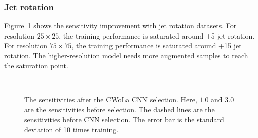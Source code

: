 \documentclass[12pt]{article}
\begin{document}
        \subsubsection{Jet rotation}%
        \label{subs:jet_rotation}
            Figure~\ref{fig:sensitivity_improvement_origin_jet_aug_SB_1_3} shows the sensitivity improvement with jet rotation datasets. For resolution $25\times 25$, the training performance is saturated around +5 jet rotation. For resolution $75\times 75$, the training performance is saturated around +15 jet rotation. The higher-resolution model needs more augmented samples to reach the saturation point.
            \begin{figure}[htpb]
                \centering
                 \\
                \caption{The sensitivities after the CWoLa CNN selection. Here, $1.0$ and $3.0$ are the sensitivities before selection. The dashed lines are the sensitivities before CNN selection. The error bar is the standard deviation of 10 times training.}
                \label{fig:sensitivity_improvement_origin_jet_aug_SB_1_3}
            \end{figure}
\end{document}
